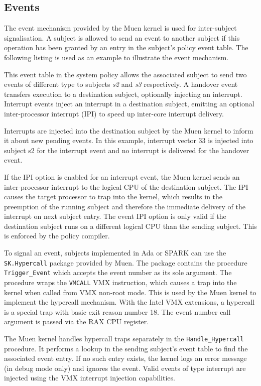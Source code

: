\subsection{Events}\label{subsec:events}
The event mechanism provided by the Muen kernel is used for
inter-subject signalisation. A subject is allowed to send an event to another
subject if this operation has been granted by an entry in the subject's policy
event table. The following listing is used as an example to illustrate the
event mechanism.



This event table in the system policy allows the associated subject to send two
events of different type to subjects \emph{s2} and \emph{s3} respectively. A
handover event transfers execution to a destination subject, optionally
injecting an interrupt.  Interrupt events inject an interrupt in a destination
subject, emitting an optional inter-processor interrupt (IPI) to
speed up inter-core interrupt delivery.

Interrupts are injected into the destination subject by the Muen kernel to
inform it about new pending events. In this example, interrupt vector 33 is
injected into subject s2 for the interrupt event and no interrupt is delivered
for the handover event.

If the IPI option is enabled for an interrupt event, the Muen kernel sends an
inter-processor interrupt to the logical CPU of the destination subject. The
IPI causes the target processor to trap into the kernel, which results in the
preemption of the running subject and therefore the immediate delivery of the
interrupt on next subject entry. The event IPI option is only valid if the
destination subject runs on a different logical CPU than the sending subject.
This is enforced by the policy compiler.

To signal an event, subjects implemented in Ada or SPARK can use the
\texttt{SK.Hypercall} package provided by Muen. The package contains the
procedure \texttt{Trigger\_Event} which accepts the event number as its sole
argument. The procedure wraps the \texttt{VMCALL} VMX instruction, which causes
a trap into the kernel when called from VMX non-root mode. This is used by the
Muen kernel to implement the hypercall mechanism.  With the Intel VMX
extensions, a hypercall is a special trap with basic exit reason number 18. The
event number call argument is passed via the RAX CPU register.

The Muen kernel handles hypercall traps separately in the
\texttt{Handle\_Hypercall} procedure. It performs a lookup in the sending
subject's event table to find the associated event entry. If no such entry
exists, the kernel logs an error message (in debug mode only) and ignores the
event. Valid events of type interrupt are injected using the VMX interrupt
injection capabilities.

